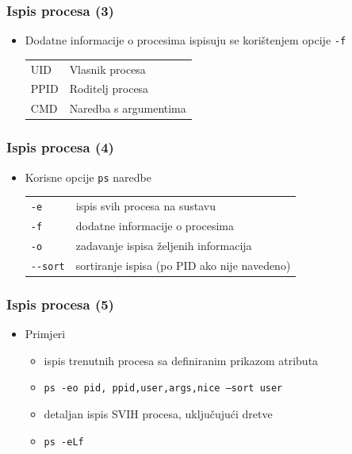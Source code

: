 \documentclass[table,usenames,dvipsnames]{beamer}
\newcommand{\shell}[1]{\texttt{#1}}
\begin{document}
\begin{frame}[t]
\frametitle{Ispis procesa (3)}
\begin{itemize}
  \item Dodatne informacije o procesima ispisuju se korištenjem opcije 
        \shell{-f}
  \begin{tabular}{l l}
    UID   & Vlasnik procesa \\
    PPID  &   Roditelj procesa \\
    CMD   &   Naredba s argumentima
  \end{tabular}
\end{itemize}
\end{frame}

\begin{frame}[t]
\frametitle{Ispis procesa (4)}
\begin{itemize}
  \item Korisne opcije \shell{ps} naredbe
  \begin{tabular}{l l}
    \shell{-e}        & ispis svih procesa na sustavu \\
    \shell{-f}        & dodatne informacije o procesima \\
    \shell{-o}        & zadavanje ispisa željenih informacija \\
    \shell{-{}-sort}  & sortiranje ispisa (po PID ako nije navedeno)
  \end{tabular} 
\end{itemize}
\end{frame}

\begin{frame}[t]
\frametitle{Ispis procesa (5)}
\begin{itemize}
  \item Primjeri
  \begin{itemize}
    \item ispis trenutnih procesa sa definiranim prikazom atributa
    \item[] \shell{ps -eo pid, ppid,user,args,nice --sort user}
    \item detaljan ispis SVIH procesa, uključujući dretve
    \item[] \shell{ps -eLf}
  \end{itemize}
\end{itemize}
\end{frame}
\end{document}
